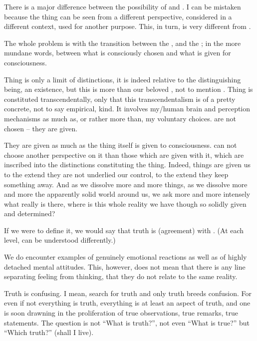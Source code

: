 \pa
There is a major difference between the possibility of 
and . I can be mistaken because the
thing can be seen from a different perspective, considered in a different
context, used for another purpose. This, in turn, is very different from
.

The whole problem is with the transition between the , 
and the ; in the more mundane words, between what is consciously
chosen and what is given for consciousness.

Thing is only a limit of distinctions, it is indeed relative to the
distinguishing being, an existence, but this  is more than our
beloved , not to mention . Thing is constituted
transcendentally, only that this transcendentalism is of a pretty concrete, not
to say empirical, kind. It involves my/human brain and perception mechanisms as
much as, or rather more than, my voluntary choices.  are not
chosen -- they are given. 

They are given as much as the thing itself is given to consciousness.  can
not choose another perspective on it than those which are given with it, which
are inscribed into the distinctions constituting the thing. Indeed, things are
given us to the extend they are not underlied our control, to the extend they
keep something away. And as we dissolve more and more things, as we dissolve
more and more the apparently solid world around us, we ask more and more
intensely what really is there, where is this whole reality we have though so
solidly given and determined?



\pa
If we were to define it, we would say that truth is (agreement) with
. (At each level,  can be understood differently.)

\pa
We do encounter examples of genuinely emotional reactions as well as of
highly detached mental attitudes. This, however, does not mean that there is
any line separating feeling from thinking, that they do not relate to the
same reality.

\pa
Truth is confusing. I mean, search for truth and only truth breeds
confusion. For even if not everything is truth, everything is at least an
aspect of truth, and one is soon drawning in the proliferation of true
observations, true remarks, true statements. The question is not ``What is
truth?'', not even ``What is true?'' but ``Which truth?'' (shall I live).

